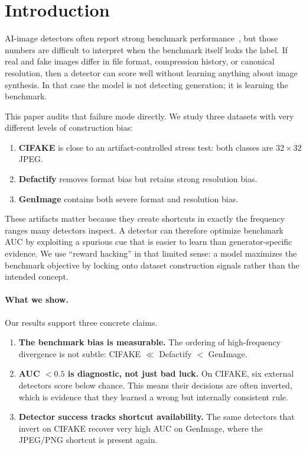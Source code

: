 \section{Introduction}
\label{sec:intro}

AI-image detectors often report strong benchmark performance~\cite{wang2020cnn,corvi2023intriguing,ricker2024aeroblade}, but those numbers are difficult to interpret when the benchmark itself leaks the label. If real and fake images differ in file format, compression history, or canonical resolution, then a detector can score well without learning anything about image synthesis. In that case the model is not detecting generation; it is learning the benchmark.

This paper audits that failure mode directly. We study three datasets with very different levels of construction bias:
\begin{enumerate}
  \item \textbf{CIFAKE} is close to an artifact-controlled stress test: both classes are $32\times32$ JPEG.
  \item \textbf{Defactify} removes format bias but retains strong resolution bias.
  \item \textbf{GenImage} contains both severe format and resolution bias.
\end{enumerate}
These artifacts matter because they create shortcuts in exactly the frequency ranges many detectors inspect. A detector can therefore optimize benchmark AUC by exploiting a spurious cue that is easier to learn than generator-specific evidence. We use ``reward hacking'' in that limited sense: a model maximizes the benchmark objective by locking onto dataset construction signals rather than the intended concept.

\paragraph{What we show.}
Our results support three concrete claims.
\begin{enumerate}
  \item \textbf{The benchmark bias is measurable.} The ordering of high-frequency divergence is not subtle: CIFAKE $\ll$ Defactify $<$ GenImage.
  \item \textbf{AUC $< 0.5$ is diagnostic, not just bad luck.} On CIFAKE, six external detectors score below chance. This means their decisions are often inverted, which is evidence that they learned a wrong but internally consistent rule.
  \item \textbf{Detector success tracks shortcut availability.} The same detectors that invert on CIFAKE recover very high AUC on GenImage, where the JPEG/PNG shortcut is present again.
\end{enumerate}

